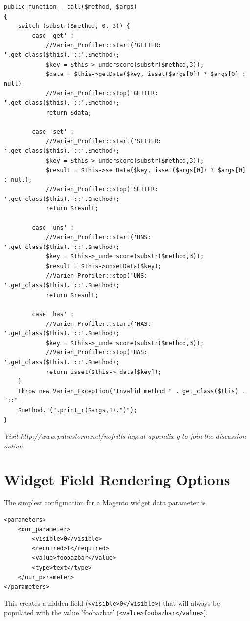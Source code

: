 \documentclass[oneside]{book}
\begin{document}
\begin{lstlisting}
public function __call($method, $args)
{
    switch (substr($method, 0, 3)) {
        case 'get' :
            //Varien_Profiler::start('GETTER: '.get_class($this).'::'.$method);
            $key = $this->_underscore(substr($method,3));
            $data = $this->getData($key, isset($args[0]) ? $args[0] : null);
            //Varien_Profiler::stop('GETTER: '.get_class($this).'::'.$method);
            return $data;

        case 'set' :
            //Varien_Profiler::start('SETTER: '.get_class($this).'::'.$method);
            $key = $this->_underscore(substr($method,3));
            $result = $this->setData($key, isset($args[0]) ? $args[0] : null);
            //Varien_Profiler::stop('SETTER: '.get_class($this).'::'.$method);
            return $result;

        case 'uns' :
            //Varien_Profiler::start('UNS: '.get_class($this).'::'.$method);
            $key = $this->_underscore(substr($method,3));
            $result = $this->unsetData($key);
            //Varien_Profiler::stop('UNS: '.get_class($this).'::'.$method);
            return $result;

        case 'has' :
            //Varien_Profiler::start('HAS: '.get_class($this).'::'.$method);
            $key = $this->_underscore(substr($method,3));
            //Varien_Profiler::stop('HAS: '.get_class($this).'::'.$method);
            return isset($this->_data[$key]);
    }
    throw new Varien_Exception("Invalid method " . get_class($this) . "::" .
    $method."(".print_r($args,1).")");
}

\end{lstlisting}


\emph{Visit http://www.pulsestorm.net/nofrills-layout-appendix-g to join the discussion online.}
\chapter{Widget Field Rendering Options}
The simplest configuration for a Magento widget data parameter is

\begin{lstlisting}
<parameters>
    <our_parameter>
        <visible>0</visible>
        <required>1</required>
        <value>foobazbar</value>
        <type>text</type>
    </our_parameter>
</parameters>

\end{lstlisting}


This creates a hidden field (\footnotesize\texttt{\textless visible\textgreater 0\textless /visible\textgreater }\normalsize) that will always be populated with the value 'foobazbar' (\footnotesize\texttt{\textless value\textgreater foobazbar\textless /value\textgreater }\normalsize).
\end{document}
